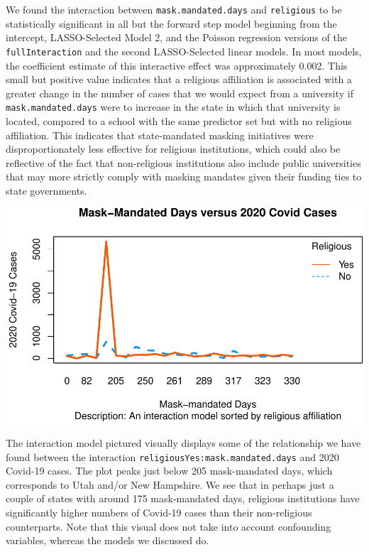 \documentclass[
]{article}
\begin{document}
We found the interaction between \texttt{mask.mandated.days} and
\texttt{religious} to be statistically significant in all but the
forward step model beginning from the intercept, LASSO-Selected Model 2,
and the Poisson regression versions of the \texttt{fullInteraction} and
the second LASSO-Selected linear models. In most models, the coefficient
estimate of this interactive effect was approximately 0.002. This small
but positive value indicates that a religious affiliation is associated
with a greater change in the number of cases that we would expect from a
university if \texttt{mask.mandated.days} were to increase in the state
in which that university is located, compared to a school with the same
predictor set but with no religious affiliation. This indicates that
state-mandated masking initiatives were disproportionately less
effective for religious institutions, which could also be reflective of
the fact that non-religious institutions also include public
universities that may more strictly comply with masking mandates given
their funding ties to state governments.

\includegraphics{final_files/figure-latex/unnamed-chunk-45-1.pdf}

The interaction model pictured visually displays some of the
relationship we have found between the interaction
\texttt{religiousYes:mask.mandated.days} and 2020 Covid-19 cases. The
plot peaks just below 205 mask-mandated days, which corresponds to Utah
and/or New Hampshire. We see that in perhaps just a couple of states
with around 175 mask-mandated days, religious institutions have
significantly higher numbers of Covid-19 cases than their non-religious
counterparts. Note that this visual does not take into account
confounding variables, whereas the models we discussed do.
\end{document}
